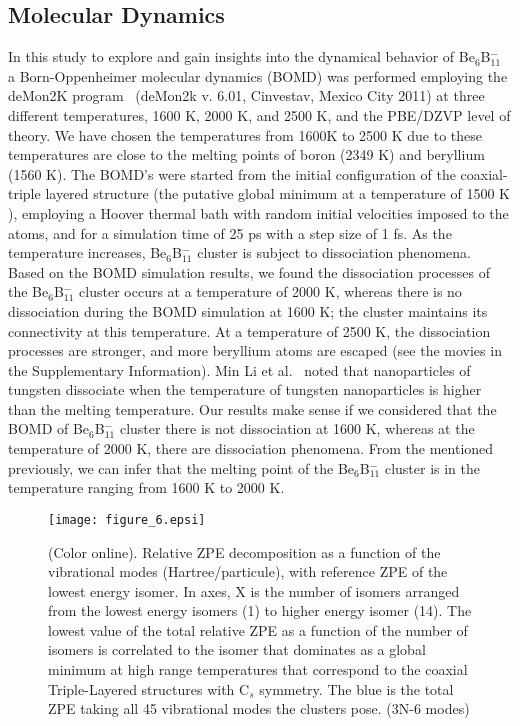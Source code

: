 \documentclass[prb,aps,preprint,showkeys,showpacs]{revtex4}
\begin{document}
 \subsection{Molecular Dynamics}
 In this study to explore and gain insights into the dynamical behavior of Be$_6$B$_{11}^-$  a Born-Oppenheimer molecular dynamics (BOMD) was performed employing the  deMon2K program~\cite{demon2k} (deMon2k v. 6.01, Cinvestav, Mexico City 2011) at three different temperatures, 1600 K, 2000 K, and 2500 K,  and the  PBE/DZVP level of theory. We have chosen the temperatures from 1600K to 2500 K due to these temperatures are close to the melting points of boron (2349 K) and beryllium (1560 K). The BOMD's were started from the initial configuration of the coaxial-triple layered structure (the putative global minimum at a temperature of 1500 K ), employing a Hoover thermal bath with random initial velocities imposed to the atoms, and for a simulation time of 25 ps with a step size of 1 fs. As the temperature increases, Be$_6$B$^{-}_{11}$ cluster is subject to dissociation phenomena. Based on the BOMD simulation results, we found the dissociation processes of the Be$_6$B$^{-}_{11}$ cluster occurs at a temperature of 2000 K,  whereas there is no dissociation during the BOMD simulation at 1600 K; the cluster maintains its connectivity at this temperature.  At a temperature of 2500 K, the dissociation processes are stronger, and more beryllium atoms are escaped (see the movies in the Supplementary Information).
 Min Li et al.~\cite{Li-Min} noted that nanoparticles of tungsten dissociate when the temperature of tungsten nanoparticles is higher than the melting temperature. Our results make sense if we considered that the BOMD of Be$_6$B$^{-}_{11}$ cluster there is not dissociation at 1600 K, whereas at the temperature of 2000 K, there are dissociation phenomena. From the mentioned previously, we can infer that the melting point of the Be$_6$B$^{-}_{11}$ cluster is in the temperature ranging from 1600 K to 2000 K. 
  \begin{figure}[ht!]
  \begin{center}  
    \texttt{[image: figure\_6.epsi]}
    \caption{(Color online). Relative ZPE decomposition as a function of the vibrational modes (Hartree/particule), with reference ZPE of the lowest energy isomer. In axes, X is the number of isomers arranged from the lowest energy isomers (1) to higher energy isomer  (14). The lowest value of the total relative ZPE as a function of the number of isomers is correlated to the isomer that dominates as a global minimum at high range temperatures that correspond to the coaxial Triple-Layered structures with C$_s$ symmetry. The blue is the total ZPE taking all 45 vibrational modes the clusters pose. (3N-6 modes)}
    \label{zpe2}
  \end{center}
  \end{figure}
\end{document}
